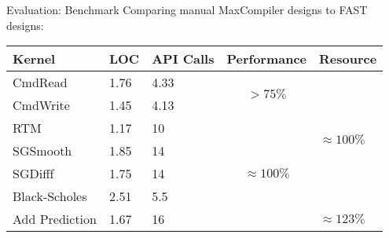 \begin{frame}{Evaluation: Benchmark}
  Comparing manual MaxCompiler designs to FAST designs:
  \begin{table}
    \renewcommand{\arraystretch}{1.2}
    \begin{tabular}{l|p{1cm}|p{1cm}|c|p{2cm}}
      \textbf{Kernel} & \textbf{LOC} & \textbf{API Calls} & \textbf{Performance}              & \textbf{Resource}
                                                                                                                                         \\
      \hline\hline
      CmdRead         & 1.76               & 4.33                     & \multirow{2}{*}{$ > 75\%$}        & \multirow{6}{3cm}{$\approx 100\%$} \\
      CmdWrite        & 1.45               & 4.13                     &                                   &                              \\
      \cline{1-4}
      RTM             & 1.17               & 10                       & \multirow{5}{*}{$ \approx 100\%$} &                              \\
      SGSmooth        & 1.85               & 14                       &                                   &                              \\
      SGDifff         & 1.75               & 14                       &                                   &                              \\
      Black-Scholes   & 2.51               & 5.5                      &                                   &                              \\
      \cline{5-5}
      Add Prediction  & 1.67               & 16                       &                                   &    $ \approx 123 \% $                          \\
    \end{tabular}
  \end{table}

\end{frame}